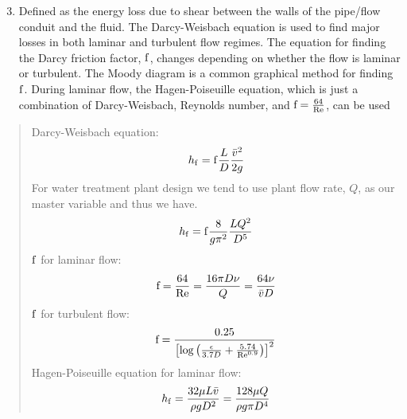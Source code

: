 \documentclass[letterpaper,10pt,english]{sphinxmanual}
\begin{document}
\begin{enumerate}
\setcounter{enumi}{2}
\item {} 
 Defined as the energy loss due to shear between the walls of the pipe/flow conduit and the fluid. The Darcy-Weisbach equation is used to find major losses in both laminar and turbulent flow regimes. The equation for finding the Darcy friction factor, \(\rm{f}\), changes depending on whether the flow is laminar or turbulent. The Moody diagram is a common graphical method for finding \(\rm{f}\). During laminar flow, the Hagen-Poiseuille equation, which is just a combination of Darcy-Weisbach, Reynolds number, and \({\rm{f}} = \frac{64}{\rm{Re}}\), can be used

\end{enumerate}
\begin{quote}

Darcy-Weisbach equation:
\begin{equation}\label{equation:Fluids_Review/Fluids_Review_Design:Fluids_Review/Fluids_Review_Design:40}
\begin{split}h_{\rm{f}} = {\rm{f}} \frac{L}{D} \frac{\bar v^2}{2g}\end{split}
\end{equation}
For water treatment plant design we tend to use plant flow rate, \(Q\), as our master variable and thus we have.
\begin{equation}\label{equation:Fluids_Review/Fluids_Review_Design:Fluids_Review/Fluids_Review_Design:41}
\begin{split}h_{\rm{f}} = {\rm{f}} \frac{8}{g \pi^2} \frac{LQ^2}{D^5}\end{split}
\end{equation}
\(\rm{f}\) for laminar flow:
\begin{equation}\label{equation:Fluids_Review/Fluids_Review_Design:Fluids_Review/Fluids_Review_Design:42}
\begin{split}{\rm{f}} = \frac{64}{\rm{Re}} = \frac{16 \pi D \nu}{Q} = \frac{64 \nu}{\bar v D}\end{split}
\end{equation}
\(\rm{f}\) for turbulent flow:
\begin{equation}\label{equation:Fluids_Review/Fluids_Review_Design:Fluids_Review/Fluids_Review_Design:43}
\begin{split}{\rm{f}} = \frac{0.25} {\left[ \log \left( \frac{\epsilon }{3.7D} + \frac{5.74}{{\rm Re}^{0.9}} \right) \right]^2}\end{split}
\end{equation}
Hagen-Poiseuille equation for laminar flow:
\begin{equation}\label{equation:Fluids_Review/Fluids_Review_Design:Fluids_Review/Fluids_Review_Design:44}
\begin{split}h_{\rm{f}} = \frac{32\mu L \bar v}{\rho gD^2} = \frac{128\mu Q}{\rho g\pi D^4}\end{split}
\end{equation}\end{quote}
\end{document}

